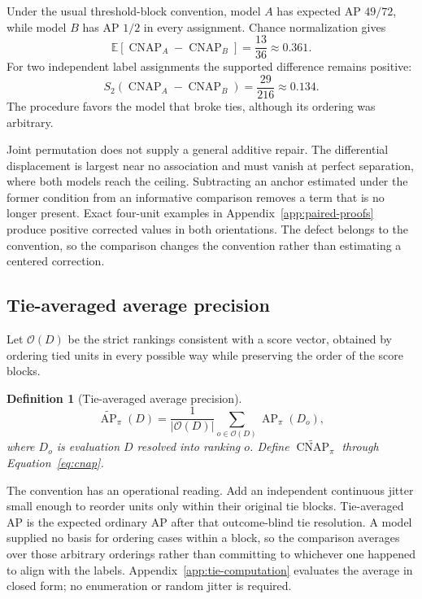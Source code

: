 \documentclass[11pt]{article}
\newcommand{\AP}{\operatorname{AP}}
\newcommand{\CNAP}{\operatorname{CNAP}}
\newcommand{\E}{\mathbb{E}}
\newcommand{\APta}{\widetilde{\AP}}
\newcommand{\CNAPta}{\widetilde{\CNAP}}
\newtheorem{definition}{Definition}
\theoremstyle{remark}
\begin{document}
Under the usual threshold-block convention, model $A$ has expected AP $49/72$, while model $B$ has AP $1/2$ in every assignment. Chance normalization gives
\[
\E[\CNAP_A-\CNAP_B]
=
\frac{13}{36}
\approx0.361.
\]
For two independent label assignments the supported difference remains positive:
\[
S_2(\CNAP_A-\CNAP_B)
=
\frac{29}{216}
\approx0.134.
\]
The procedure favors the model that broke ties, although its ordering was arbitrary.

Joint permutation does not supply a general additive repair. The differential displacement is largest near no association and must vanish at perfect separation, where both models reach the ceiling. Subtracting an anchor estimated under the former condition from an informative comparison removes a term that is no longer present. Exact four-unit examples in Appendix~\ref{app:paired-proofs} produce positive corrected values in both orientations. The defect belongs to the convention, so the comparison changes the convention rather than estimating a centered correction.

\subsection{Tie-averaged average precision}
\label{sec:tie-average}

Let $\mathcal O(D)$ be the strict rankings consistent with a score vector, obtained by ordering tied units in every possible way while preserving the order of the score blocks.

\begin{definition}[Tie-averaged average precision]
\begin{equation}
\APta_\pi(D)
=
\frac{1}{|\mathcal O(D)|}
\sum_{o\in\mathcal O(D)}
\AP_\pi(D_o),
\label{eq:tie-average}
\end{equation}
where $D_o$ is evaluation $D$ resolved into ranking $o$. Define $\CNAPta_\pi$ through Equation~\eqref{eq:cnap}.
\end{definition}

The convention has an operational reading. Add an independent continuous jitter small enough to reorder units only within their original tie blocks. Tie-averaged AP is the expected ordinary AP after that outcome-blind tie resolution. A model supplied no basis for ordering cases within a block, so the comparison averages over those arbitrary orderings rather than committing to whichever one happened to align with the labels. Appendix~\ref{app:tie-computation} evaluates the average in closed form; no enumeration or random jitter is required.
\end{document}
